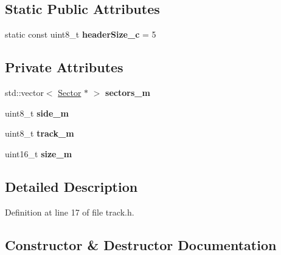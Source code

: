 \subsection*{Static Public Attributes}
\begin{DoxyCompactItemize}
\item 
\hypertarget{classTrack_a20bcad23f0aad0f0d5d2ecb39aa976f8}{}static const uint8\+\_\+t {\bfseries header\+Size\+\_\+c} = 5\label{classTrack_a20bcad23f0aad0f0d5d2ecb39aa976f8}

\end{DoxyCompactItemize}
\subsection*{Private Attributes}
\begin{DoxyCompactItemize}
\item 
\hypertarget{classTrack_ad113ec1b91101dabb5d20128f5056706}{}std\+::vector$<$ \hyperlink{classSector}{Sector} $\ast$ $>$ {\bfseries sectors\+\_\+m}\label{classTrack_ad113ec1b91101dabb5d20128f5056706}

\item 
\hypertarget{classTrack_ad0912a46e2296261eb5b9c82018ac71d}{}uint8\+\_\+t {\bfseries side\+\_\+m}\label{classTrack_ad0912a46e2296261eb5b9c82018ac71d}

\item 
\hypertarget{classTrack_a7a147a66e6f77db34655f9572efc3c29}{}uint8\+\_\+t {\bfseries track\+\_\+m}\label{classTrack_a7a147a66e6f77db34655f9572efc3c29}

\item 
\hypertarget{classTrack_a44da8849eb09ecd4a3d6f4d4d70854e9}{}uint16\+\_\+t {\bfseries size\+\_\+m}\label{classTrack_a44da8849eb09ecd4a3d6f4d4d70854e9}

\end{DoxyCompactItemize}


\subsection{Detailed Description}


Definition at line 17 of file track.\+h.



\subsection{Constructor \& Destructor Documentation}
\hypertarget{classTrack_a62eb2440ac055145ef72e27c5d2682b9}{}
